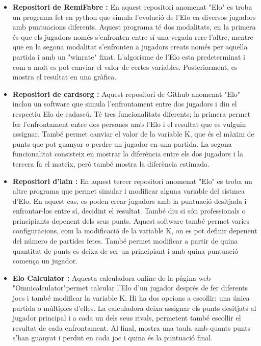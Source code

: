 \documentclass[a4paper]{article}
\begin{document}
\begin{itemize}
    \item \textbf{Repositori de RemiFabre \cite{EloSystemRemi}:} En aquest repositori anomenat "Elo" \space es troba un programa fet en python que simula l'evolució de l'Elo en diversos jugadors amb puntuacions diferents. Aquest programa té dos modalitats, en la primera és que els jugadors només s'enfronten entre sí una vegada rere l'altre, mentre que en la segona modalitat s'enfronten a jugadors creats només per aquella partida i amb un "winrate" \space fixat. L'algorisme de l'Elo esta predeterminat i com a molt es pot canviar el valor de certes variables. Posteriorment, es mostra el resultat en una gràfica. 
    
    \item \textbf{Repositori de cardsorg \cite{EloSystemCardsorg}:} Aquest repositori de Github anomenat "Elo" \space inclou un software que simula l'enfrontament entre dos jugadors i diu el respectiu Elo de cadascú. Té tres funcionalitats diferents; la primera permet fer l'enfrontament entre dos persones amb l'Elo i el resultat que es vulguin assignar. També permet canviar el valor de la variable K, que és el màxim de punts que pot guanyar o perdre un jugador en una partida. La segona funcionalitat consisteix en mostrar la diferència entre els dos jugadors i la tercera fa el mateix, però també mostra la diferència estimada.
    
    \item \textbf{Repositori d'iain \cite{EloSystemiain}:} En aquest tercer repositori anomenat "Elo" \space es troba un altre programa que permet simular i modificar alguna variable del sistmea d'Elo. En aquest cas, es poden crear jugadors amb la puntuació desitjada i enfrontar-los entre sí, decidint el resultat. També diu si són professionals o principiants depenent dels seus punts. Aquest software també permet varies configuracions, com la modificació de la variable K, on es pot definir depenent del número de partides fetes. També permet modificar a partir de quina quantitat de punts es deixa de ser un principiant i amb quina puntuació comença un jugador.
    
    \item \textbf{Elo Calculator \cite{EloSystemOmnicalculator}:} Aquesta calculadora online de la pàgina web "Omnicalculator"\space permet calcular l'Elo d'un jugador després de fer diferents jocs i també modificar la variable K. Hi ha dos opcions a escollir: una única partida o múltiples d'elles. La calculadora deixa assignar els punts desitjats al jugador principal i a cada un dels seus rivals, permetent també escollir el resultat de cada enfrontament. Al final, mostra una taula amb quants punts s'han guanyat i perdut en cada joc i quina és la puntuació final.
\end{itemize}
\end{document}
